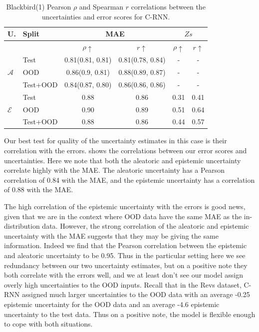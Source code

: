 \begin{table}[h]
\centering
    \begin{tabular}{l l c c c c}  
        \toprule
        U. & Split & \multicolumn{2}{c}{MAE} & \multicolumn{2}{c}{$Zs$}\\
        \midrule
        & & $\rho \uparrow$ & $r \uparrow$ & $\rho \uparrow$ & $r \uparrow$ \\
        \multirow{3}{*}{$\mathcal{A}$} 
            & Test     & 0.81(0.81, 0.81) & 0.81(0.78, 0.84) & - & - \\  
            & OOD      & 0.86(0.9, 0.81) & 0.88(0.89, 0.87) & - & - \\  
            & Test+OOD & 0.84(0.87, 0.80) & 0.86(0.86, 0.86) & - & - \\ 

        \midrule
        \multirow{3}{*}{$\mathcal{E}$} 
            & Test     & 0.88  & 0.86 &  0.31  & 0.41 \\  
            & OOD      & 0.90 & 0.89 &  0.51 & 0.64 \\
            & Test+OOD & 0.88 & 0.86 &  0.44 & 0.57 \\ 

        \toprule
    \end{tabular}
    \caption[Blackbird(1) error-uncertainty correlation for C-RNN]{Blackbird(1) Pearson $\rho$ and Spearman $r$ correlations between the uncertainties and error scores for C-RNN.}
    \label{tbl:bb1_corr}
\end{table}

Our best test for quality of the uncertainty estimates in this case is their correlation with the errors.  shows the correlations between our error scores and uncertainties.  Here we note that both the aleatoric and epistemic uncertainty correlate highly with the MAE. The aleatoric uncertainty has a Pearson correlation of 0.84 with the MAE, and the epistemic uncertainty has a correlation of 0.88 with the MAE. 

The high correlation of the epistemic uncertainty with the errors is good news, given that we are in the context where OOD data have the same MAE as the in-distribution data. However, the strong correlation of the aleatoric and epistemic uncertainty with the MAE suggests that they may be giving the same information. Indeed we find that the Pearson correlation between the epistemic and aleatoric uncertainty to be 0.95. Thus in the particular setting here we see redundancy between our two uncertainty estimates, but on a positive note they both correlate with the errors well, and we at least don't see our model assign overly high uncertainties to the OOD inputs. Recall that in the Revs dataset, C-RNN assigned much larger uncertainties to the OOD data with an average -0.25 epistemic uncertainty for the OOD data and an average -4.6 epistemic uncertainty to the test data. Thus on a positive note, the model is flexible enough to cope with both situations. 

